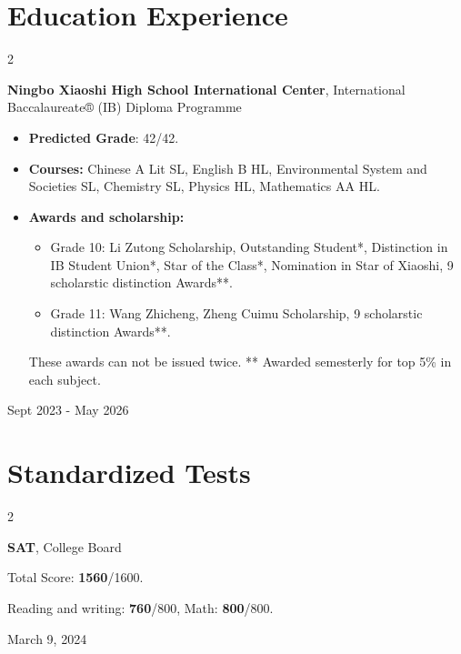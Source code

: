 \documentclass[10pt, letterpaper]{article}
\newenvironment{highlights}{
    \begin{itemize}[
        topsep=0.10 cm,
        parsep=0.10 cm,
        partopsep=0pt,
        itemsep=0pt,
        leftmargin=0.4 cm + 10pt
    ]
}{
    \end{itemize}
} %
\newenvironment{twocolentry}[2][]{
    \onecolentry
    \def\secondColumn{#2}
    \setcolumnwidth{\fill, 4.5 cm}
    \begin{paracol}{2}
}{
    \switchcolumn \raggedleft \secondColumn
    \end{paracol}
    \endonecolentry
} %
\let\hrefWithoutArrow\href
\renewcommand{\href}[2]{\hrefWithoutArrow{#1}{\ifthenelse{\equal{#2}{}}{ }{#2 }\raisebox{.15ex}{\footnotesize \faExternalLink*}}}
\begin{document}
    \section{Education Experience}
        \begin{twocolentry}{ Sept 2023 - May 2026 }
            \textbf{Ningbo Xiaoshi High School International Center}, International Baccalaureate® (IB) Diploma Programme
            \begin{highlights}
                \item \textbf{Predicted Grade}: 42/42. %
                \item \textbf{Courses:} Chinese A Lit SL, English B HL, Environmental System and Societies SL, Chemistry SL, Physics HL, Mathematics AA HL.
                \item \textbf{Awards and scholarship:}
                \begin{itemize}
                    \item Grade 10: Li Zutong Scholarship, Outstanding Student*, Distinction in IB Student Union*, Star of the Class*, Nomination in Star of Xiaoshi, 9 scholarstic distinction Awards**.
                    \item Grade 11: Wang Zhicheng, Zheng Cuimu Scholarship, 9 scholarstic distinction Awards**.
                \end{itemize}
                {
                    \small *These awards can not be issued twice.
                    ** Awarded semesterly for top 5\% in each subject.
                }
                
            \end{highlights}
        \end{twocolentry}


    \section{Standardized Tests}
    \begin{twocolentry}{March 9, 2024}
        \setlength{\parindent}{20pt}

        \noindent\textbf{SAT}, College Board

        \vspace{5pt}

        Total Score: \textbf{1560}/1600. 

        Reading and writing: \textbf{760}/800, Math: \textbf{800}/800.
        
    \end{twocolentry}
\end{document}
